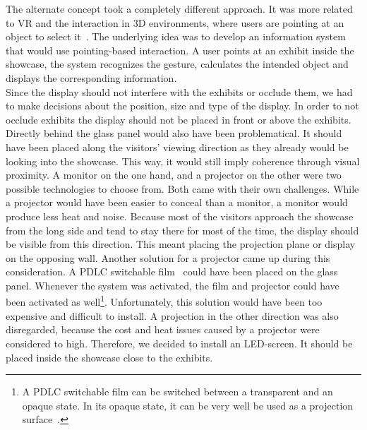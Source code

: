 The alternate concept took a completely different approach. It was more related to \ac{VR} and the interaction in \ac{3D} environments, where users are pointing at an object to select it~\cite{VRObjectSelectionCnG}. The underlying idea was to develop an information system that would use pointing-based interaction. A user points at an exhibit inside the showcase, the system recognizes the gesture, calculates the intended object and displays the corresponding information.
\\
Since the display should not interfere with the exhibits or occlude them, we had to make decisions about the position, size and type of the display. In order to not occlude exhibits the display should not be placed in front or above the exhibits. Directly behind the glass panel would also have been problematical. It should have been placed along the visitors' viewing direction as they already would be looking into the showcase. This way, it would still imply coherence through visual proximity. A monitor on the one hand, and a projector on the other were two possible technologies to choose from. Both came with their own challenges. While a projector would have been easier to conceal than a monitor, a monitor would produce less heat and noise. Because most of the visitors approach the showcase from the long side and tend to stay there for most of the time, the display should be visible from this direction. This meant placing the projection plane or display on the opposing wall. Another solution for a projector came up during this consideration. A \ac{PDLC} switchable film~\cite{PDLC} could have been placed on the glass panel. Whenever the system was activated, the film and projector could have been activated as well\footnote{A \ac{PDLC} switchable film can be switched between a transparent and an opaque state. In its opaque state, it can be very well be used as a projection surface~\cite{PDLC}.}. Unfortunately, this solution would have been too expensive and difficult to install. A projection in the other direction was also disregarded, because the cost and heat issues caused by a projector were considered to high. Therefore, we decided to install an LED-screen. It should be placed inside the showcase close to the exhibits.

